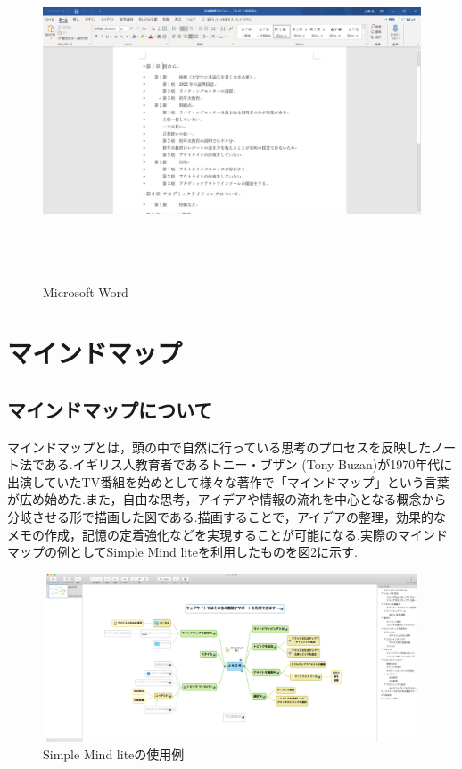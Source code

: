 \documentclass[a4j,12pt]{jarticle}
\begin{document}
\begin{figure}[H]
\begin{center}
 \includegraphics[clip,width=130mm,height=100mm]{figure/word.png}
 \end{center}
 \caption{Microsoft Word}
 \label{fig:d}
\end{figure}

\newpage
\section{マインドマップ}
\subsection{マインドマップについて}
マインドマップとは，頭の中で自然に行っている思考のプロセスを反映したノート法である.イギリス人教育者であるトニー・ブザン (Tony Buzan)が1970年代に出演していたTV番組を始めとして様々な著作で「マインドマップ」という言葉が広め始めた\cite{ren4}.また，自由な思考，アイデアや情報の流れを中心となる概念から分岐させる形で描画した図である.描画することで，アイデアの整理，効果的なメモの作成，記憶の定着強化などを実現することが可能になる.実際のマインドマップの例としてSimple Mind liteを利用したものを図\ref{fig:e}に示す.
\begin{figure}[h]
\begin{center}
 \includegraphics[clip,width=130mm,height=50mm]{figure/maindmap.png}
\end{center}
 \caption{Simple Mind liteの使用例}
 \label{fig:e}
\end{figure}
\newpage
\end{document}
